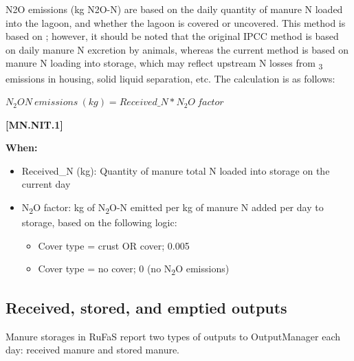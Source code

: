 \begin{refsection}
N2O emissions (kg N2O-N) are based on the daily quantity of manure N loaded into the lagoon, and whether the lagoon is covered or uncovered. This method is based on \cite{IPCC2019}; however, it should be noted that the original IPCC method is based on daily manure N excretion by animals, whereas the current method is based on manure N loading into storage, which may reflect upstream N losses from \textsubscript{3} emissions in housing, solid liquid separation, etc. The calculation is as follows:
            \vspace{0.5cm}

    \begin{center}
        \(N_2ON\ emissions\ (kg) = Received\_N * N_2O\ factor\)
    \end{center}
        \vspace{0.5cm} 
    
            {\raggedleft \textbf{[MN.NIT.1]}\par}
            \vspace{0.5cm}
            
    \textbf{When:}

    \begin{itemize}
        \item Received\_N (kg): Quantity of manure total N loaded into storage on the current day
        \item N\textsubscript{2}O factor: kg of N\textsubscript{2}O-N emitted per kg of manure N added per day to storage, based on the following logic:
        \begin{itemize}
            \item Cover type = crust OR cover; 0.005
            \item Cover type = no cover; 0 (no N\textsubscript{2}O emissions)
        \end{itemize}

    \end{itemize}
\vspace{0.5cm}

    

\subsection{Received, stored, and emptied outputs}
    \vspace{0.15cm}

Manure storages in RuFaS report two types of outputs to OutputManager each day: received manure and stored manure. 
    \vspace{0.15cm}


\end{refsection}
